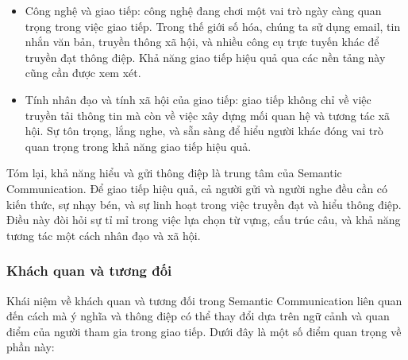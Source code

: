 \documentclass{article} %
\begin{document}
\begin{itemize}
\item Công nghệ và giao tiếp: công nghệ đang chơi một vai trò ngày càng quan trọng trong việc giao tiếp. Trong thế giới số hóa, chúng ta sử dụng email, tin nhắn văn bản, truyền thông xã hội, và nhiều công cụ trực tuyến khác để truyền đạt thông điệp. Khả năng giao tiếp hiệu quả qua các nền tảng này cũng cần được xem xét.

\item Tính nhân đạo và tính xã hội của giao tiếp: giao tiếp không chỉ về việc truyền tải thông tin mà còn về việc xây dựng mối quan hệ và tương tác xã hội. Sự tôn trọng, lắng nghe, và sẵn sàng để hiểu người khác đóng vai trò quan trọng trong khả năng giao tiếp hiệu quả.
\end{itemize}

Tóm lại, khả năng hiểu và gửi thông điệp là trung tâm của Semantic Communication. Để giao tiếp hiệu quả, cả người gửi và người nghe đều cần có kiến thức, sự nhạy bén, và sự linh hoạt trong việc truyền đạt và hiểu thông điệp. Điều này đòi hỏi sự tỉ mỉ trong việc lựa chọn từ vựng, cấu trúc câu, và khả năng tương tác một cách nhân đạo và xã hội.

\subsubsection{Khách quan và tương đối}

Khái niệm về khách quan và tương đối trong Semantic Communication liên quan đến cách mà ý nghĩa và thông điệp có thể thay đổi dựa trên ngữ cảnh và quan điểm của người tham gia trong giao tiếp. Dưới đây là một số điểm quan trọng về phần này:
\end{document}
